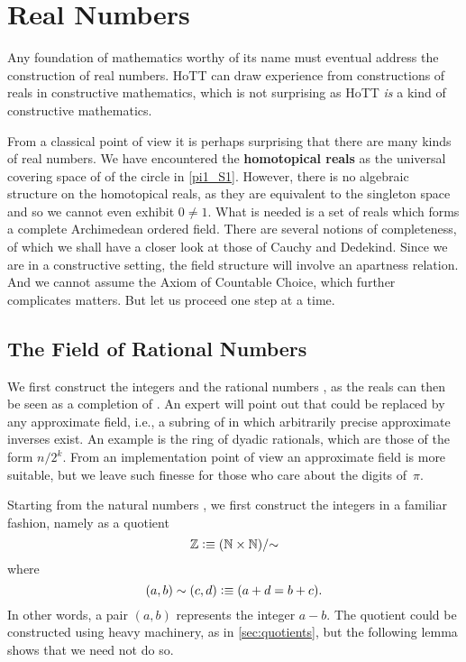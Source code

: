 \newcommand{\rclim}{\mathsf{lim}} %
\newcommand{\rcrat}{\mathsf{rat}} %
\newcommand{\Qp}{\Q_{+}}

\chapter{Real Numbers}
\label{cha:real-numbers}

Any foundation of mathematics worthy of its name must eventual address the construction of
real numbers. HoTT can draw experience from constructions of reals in constructive
mathematics, which is not surprising as HoTT \emph{is} a kind of constructive mathematics.

From a classical point of view it is perhaps surprising that there are many kinds of real
numbers. We have encountered the \textbf{homotopical reals} as the universal covering
space of of the circle in \autoref{pi1_S1}. However, there is no algebraic structure on
the homotopical reals, as they are equivalent to the singleton space and so we cannot even
exhibit $0 \neq 1$. What is needed is a set of reals which forms a complete Archimedean
ordered field. There are several notions of completeness, of which we shall have a closer
look at those of Cauchy and Dedekind. Since we are in a constructive setting, the field
structure will involve an apartness relation. And we cannot assume the Axiom of Countable
Choice, which further complicates matters. But let us proceed one step at a time.

\section{The Field of Rational Numbers}
\label{sec:field-rati-numb}

We first construct the integers \Z and the rational numbers \Q, as the reals can then be
seen as a completion of \Q. An expert will point out that \Q could be replaced by any
approximate field, i.e., a subring of \Q in which arbitrarily precise approximate inverses
exist. An example is the ring of dyadic rationals, which are those of the form $n/2^k$.
From an implementation point of view an approximate field is more suitable, but we leave
such finesse for those who care about the digits of~$\pi$.

Starting from the natural numbers \N, we first construct the integers in a familiar
fashion, namely as a quotient
%
\[ \mathbb{Z} \vcentcolon\equiv (\mathbb{N} \times \mathbb{N})/{\sim} \]
%
where
%
\[ (a,b) \sim (c,d) \vcentcolon\equiv (a + d = b + c). \]
%
In other words, a pair $(a,b)$ represents the integer $a - b$. The quotient could be
constructed using heavy machinery, as in \autoref{sec:quotients}, but the following lemma
shows that we need not do so.

